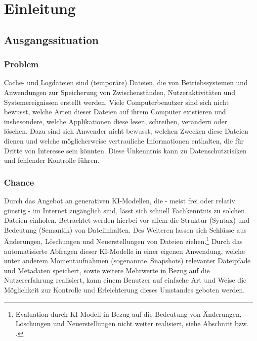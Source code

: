 \documentclass[a4paper,12pt]{report}
\begin{document}
    \chapter{Einleitung}


    \section{Ausgangssituation}

    \subsection{Problem}\label{subsec:problem}
    Cache- und Logdateien sind (temporäre) Dateien, die von Betriebssystemen und
    Anwendungen zur Speicherung von Zwischenständen, Nutzeraktivitäten und
    Systemereignissen erstellt werden.
    Viele Computerbenutzer sind sich nicht bewusst, welche Arten dieser Dateien auf ihrem
    Computer existieren und insbesondere, welche Applikationen diese lesen, schreiben,
    verändern oder löschen.
    Dazu sind sich Anwender nicht bewusst, welchen Zwecken
    diese Dateien dienen und welche möglicherweise vertrauliche Informationen enthalten,
    die für Dritte von Interesse sein könnten.
    Diese Unkenntnis kann zu Datenschutzrisiken
    und fehlender Kontrolle führen.

    \subsection{Chance}\label{subsec:chance}
    Durch das Angebot an generativen KI-Modellen, die - meist frei oder relativ günstig - im
    Internet zugänglich sind, lässt sich schnell Fachkenntnis zu solchen Dateien einholen.
    Betrachtet werden hierbei vor allem die Struktur (Syntax) und Bedeutung (Semantik) von Dateiinhalten.
    Des Weiteren lassen sich Schlüsse aus Änderungen, Löschungen und Neuerstellungen von Dateien ziehen.\footnote{Evaluation durch KI-Modell in Bezug auf die Bedeutung von Änderungen, Löschungen und Neuerstellungen nicht weiter realisiert, siehe Abschnitt  bzw. .}
    Durch das automatisierte Abfragen dieser KI-Modelle in einer eigenen Anwendung,
    welche unter anderem Momentaufnahmen (sogenannte\ Snapshots) relevanter Dateipfade und Metadaten speichert,
    sowie weitere Mehrwerte in Bezug auf die Nutzererfahrung realisiert, kann einem
    Benutzer auf einfache Art und Weise die Möglichkeit zur Kontrolle und Erleichterung dieses Umstandes
    geboten werden.
\end{document}
